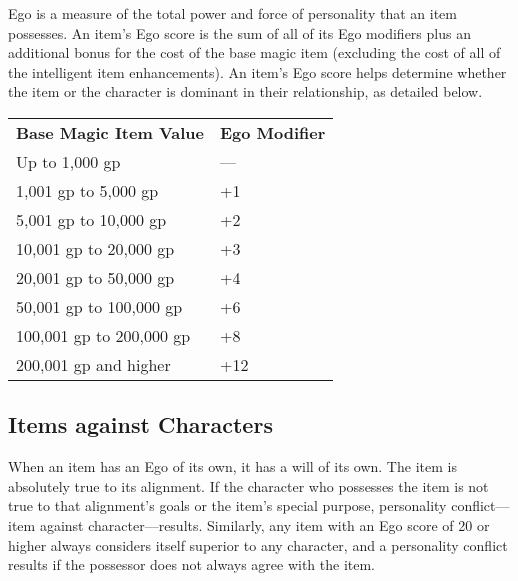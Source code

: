 				
Ego is a measure of the total power and force of personality that an item possesses. An item's Ego score is the sum of all of its Ego modifiers plus an additional bonus for the cost of the base magic item (excluding the cost of all of the intelligent item enhancements). An item's Ego score helps determine whether the item or the character is dominant in their relationship, as detailed below.


\begin{tabular}{ll}
\textbf{Base Magic Item Value} & \textbf{Ego Modifier} \\
Up to 1,000 gp                 & ---                     \\
1,001 gp to 5,000 gp           & +1                    \\
5,001 gp to 10,000 gp          & +2                    \\
10,001 gp to 20,000 gp         & +3                    \\
20,001 gp to 50,000 gp         & +4                    \\
50,001 gp to 100,000 gp        & +6                    \\
100,001 gp to 200,000 gp       & +8                    \\
200,001 gp and higher          & +12                  
\end{tabular}

				
\subsection{Items against Characters}

				
When an item has an Ego of its own, it has a will of its own. The item is absolutely true to its alignment. If the character who possesses the item is not true to that alignment's goals or the item's special purpose, personality conflict---item against character---results. Similarly, any item with an Ego score of 20 or higher always considers itself superior to any character, and a personality conflict results if the possessor does not always agree with the item.
				
